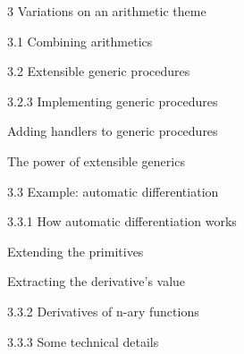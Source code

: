 \documentclass[12pt]{PalisadesLakesBook}
\begin{document}
\begin{plSection}{3 Variations on an arithmetic theme}
\begin{plSection}{3.1 Combining arithmetics}
\begin{plSection}{3.2 Extensible generic procedures}
\begin{plSection}{3.2.3 Implementing generic procedures}
\begin{plSection}{Adding handlers to generic procedures}
\end{plSection}%
\begin{plSection}{The power of extensible generics}
\end{plSection}%
\end{plSection}%
\end{plSection}%
\begin{plSection}{3.3 Example: automatic differentiation}
\begin{plSection}{3.3.1 How automatic differentiation works}
\begin{plSection}{Extending the primitives}
\end{plSection}%
\begin{plSection}{Extracting the derivative's value}
\end{plSection}%
\end{plSection}%
\begin{plSection}{3.3.2 Derivatives of n-ary functions}
\end{plSection}%
\begin{plSection}{3.3.3 Some technical details}




\end{plSection}
\end{plSection}
\end{plSection}
\end{plSection}
\end{document}
